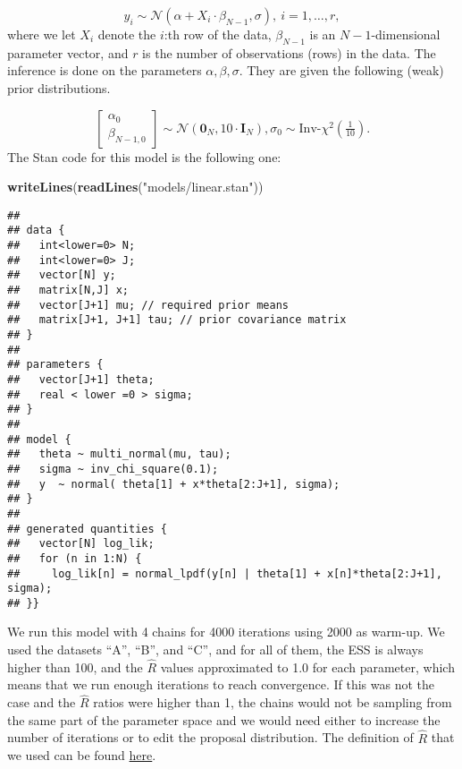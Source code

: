 \documentclass[
]{article}
\newenvironment{Shaded}{\begin{snugshade}}{\end{snugshade}}
\newcommand{\KeywordTok}[1]{\textcolor[rgb]{0.13,0.29,0.53}{\textbf{#1}}}
\newcommand{\NormalTok}[1]{#1}
\newcommand{\StringTok}[1]{\textcolor[rgb]{0.31,0.60,0.02}{#1}}
\begin{document}
\[ y_{i} \sim \mathcal{N}(\alpha + X_i \cdot\beta_{N-1}, \sigma), \ i=1,\dots,r, \]
where we let \(X_i\) denote the \(i\):th row of the data,
\(\beta_{N-1}\) is an \(N-1\)-dimensional parameter vector, and \(r\) is
the number of observations (rows) in the data. The inference is done on
the parameters \(\alpha , \beta, \sigma.\) They are given the following
(weak) prior distributions.

\[\begin{bmatrix} \alpha_0 \\ \beta_{N-1,0} \end{bmatrix} \sim \mathcal{N}(\mathbf{0}_N, 10 \cdot \mathbf{I}_N), \sigma_0 \sim \textrm{Inv-}\chi^2(\tfrac{1}{10}) .\]
The Stan code for this model is the following one:

\begin{Shaded}
\begin{Highlighting}[]
\KeywordTok{writeLines}\NormalTok{(}\KeywordTok{readLines}\NormalTok{(}\StringTok{"models/linear.stan"}\NormalTok{))}
\end{Highlighting}
\end{Shaded}

\begin{verbatim}
## 
## data {
##   int<lower=0> N;
##   int<lower=0> J;
##   vector[N] y;
##   matrix[N,J] x;
##   vector[J+1] mu; // required prior means 
##   matrix[J+1, J+1] tau; // prior covariance matrix
## }
## 
## parameters {
##   vector[J+1] theta;
##   real < lower =0 > sigma;
## }
## 
## model {
##   theta ~ multi_normal(mu, tau);
##   sigma ~ inv_chi_square(0.1);
##   y  ~ normal( theta[1] + x*theta[2:J+1], sigma);
## }
## 
## generated quantities {
##   vector[N] log_lik;
##   for (n in 1:N) {
##     log_lik[n] = normal_lpdf(y[n] | theta[1] + x[n]*theta[2:J+1], sigma);
## }}
\end{verbatim}

We run this model with 4 chains for 4000 iterations using 2000 as
warm-up. We used the datasets ``A'', ``B'', and ``C'', and for all of
them, the ESS is always higher than 100, and the \(\hat{R}\) values
approximated to 1.0 for each parameter, which means that we run enough
iterations to reach convergence. If this was not the case and the
\(\hat{R}\) ratios were higher than 1, the chains would not be sampling
from the same part of the parameter space and we would need either to
increase the number of iterations or to edit the proposal distribution.
The definition of \(\hat{R}\) that we used can be found
\href{https://arxiv.org/abs/1903.08008}{here}.
\end{document}
